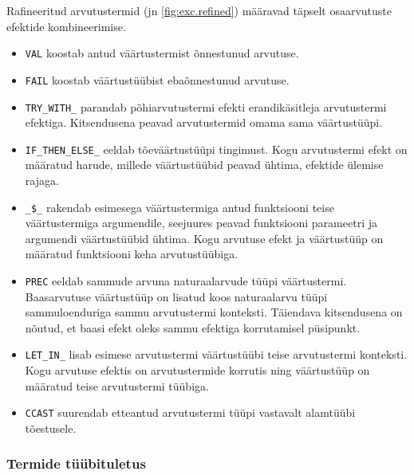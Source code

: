 \documentclass[a4paper,12pt]{article}
\begin{document}
Rafineeritud arvutustermid (jn \ref{fig:exc.refined}) määravad täpselt osaarvutuste efektide kombineerimise.
\begin{itemize}
\item {\tt VAL} koostab antud väärtustermist õnnestunud arvutuse.
\item {\tt FAIL} koostab väärtustüübist ebaõnnestunud arvutuse.
\item {\tt TRY_WITH_} parandab põhiarvutustermi efekti erandikäsitleja arvutustermi efektiga. Kitsendusena peavad arvutustermid omama sama väärtustüüpi.
\item {\tt IF_THEN_ELSE_} eeldab tõeväärtustüüpi tingimust. Kogu arvutustermi efekt on määratud harude, millede väärtustüübid peavad ühtima, efektide ülemise rajaga.
\item {\tt _\$_} rakendab esimesega väärtustermiga antud funktsiooni teise väärtustermiga argumendile, seejuures peavad funktsiooni parameetri ja argumendi väärtustüübid ühtima. Kogu arvutuse efekt ja väärtustüüp on määratud funktsiooni keha arvutustüübiga. 
\item {\tt PREC} eeldab sammude arvuna naturaalarvude tüüpi väärtustermi. Baasarvutuse väärtustüüp on lisatud koos naturaalarvu tüüpi sammuloenduriga sammu arvutustermi konteksti. Täiendava kitsendusena on nõutud, et baasi efekt oleks sammu efektiga korrutamisel püsipunkt.
\item {\tt LET_IN_} lisab esimese arvutustermi väärtustüübi teise arvutustermi konteksti. Kogu arvutuse efektis on arvutustermide korrutis ning väärtustüüp on määratud teise arvutustermi tüübiga.
\item {\tt CCAST} suurendab etteantud arvutustermi tüüpi vastavalt alamtüübi tõestusele.
\end{itemize}


\subsubsection{Termide tüübituletus}\label{sssec:exc.infer-type}
\end{document}
